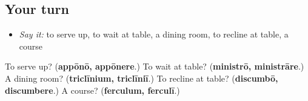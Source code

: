 \subsection*{Your turn}
\begin{itemize}
\raggedright
  \item \emph{Say it:} to serve up, to wait at table, a dining room, to recline at table, a course
\end{itemize}

\begin{tcolorbox}[breakable,colback=teal!4,colframe=teal!35!black,title={Before you move on}]
To serve up? (\textbf{appōnō, appōnere}.) To wait at table? (\textbf{ministrō, ministrāre}.) A dining room? (\textbf{triclīnium, triclīniī}.) To recline at table? (\textbf{discumbō, discumbere}.) A course? (\textbf{ferculum, ferculī}.)
\end{tcolorbox}
